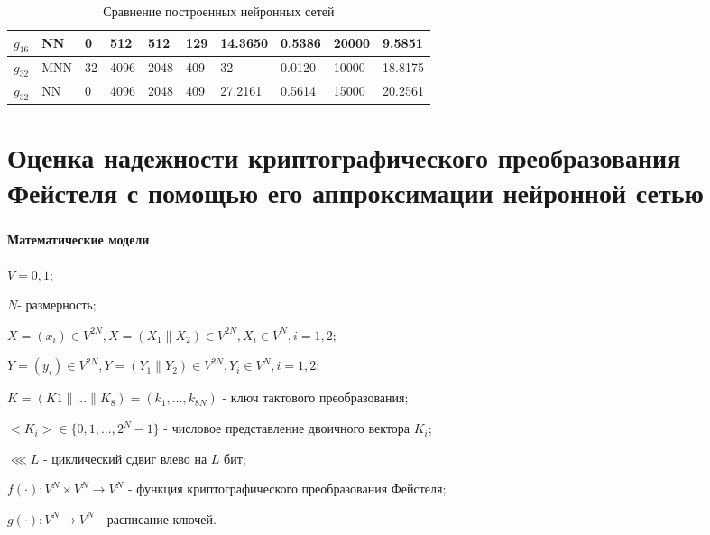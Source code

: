 \documentclass[notheorems]{beamer}
\theoremstyle{plain}
\theoremstyle{definition}
\theoremstyle{remark}
\begin{document}
\begin{frame}
\begin{table}[H]
{\begin{tabular}{|l|l|l|l|l|l|l|l|l|l|}
		$g_{16}$& NN    &      0     &            512    &         512 &   129  &   14.3650 &  0.5386   & 20000    &  9.5851    \\ \hline
		$g_{32}$& MNN   &      32     &            4096   &         2048&   409  &   32      &  0.0120   & 10000    &  18.8175     \\ \hline
		$g_{32}$& NN    &      0     &            4096   &         2048&   409  &   27.2161 &  0.5614   & 15000    &  20.2561     \\ \hline
	\end{tabular}}
	\caption{Сравнение построенных нейронных сетей}
\end{table} 
	
\end{frame}


\section{Оценка надежности криптографического преобразования Фейстеля с помощью его аппроксимации нейронной сетью}
\begin{frame}
	\frametitle{\secname}
	\framesubtitle{Математические модели}
	
	$V = {0, 1};$
	
	$N$- размерность;
	
	$X = (x_i) \in V^{2N}, X = (X_1 \| X_2) \in V^{2N}, X_i \in V^N, i=1,2;$
	
	
	$Y = (y_i) \in V^{2N}, Y = (Y_1 \| Y_2) \in V^{2N}, Y_i \in V^N, i=1,2;$
	
	
	$K=(K1\|...\|K_8)=(k_1,...,k_{8N})$ - ключ тактового преобразования;
	
	
	$<K_i> \in \{0,1,...,2^{N}-1\}$ - числовое представление двоичного вектора $K_i$;
	
	
	$\lll L$ - циклический сдвиг влево на $L$ бит;
	
	
	$f(\cdot):V^N \times V^N \rightarrow V^N$ - функция криптографического преобразования Фейстеля;
	
	
	$g(\cdot):V^N \rightarrow V^N$ - расписание ключей.
	
\end{frame}
\end{document}
